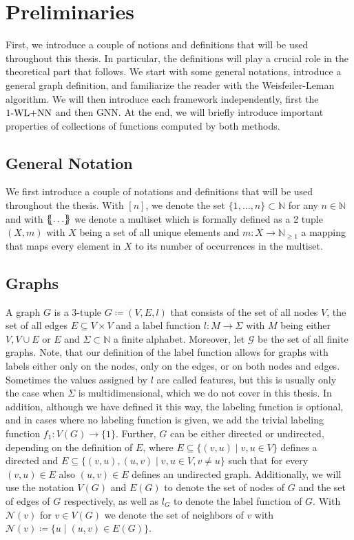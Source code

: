 \section{Preliminaries}
First, we introduce a couple of notions and definitions that will be used throughout this thesis. In particular, the definitions will play a crucial role in the theoretical part that follows. We start with some general notations, introduce a general graph definition, and familiarize the reader with the Weisfeiler-Leman algorithm. We will then introduce each framework independently, first the $\text{1-WL+NN}$ and then GNN. At the end, we will briefly introduce important properties of collections of functions computed by both methods.

\subsection{General Notation}
We first introduce a couple of notations and definitions that will be used throughout the thesis. With $[n]$, we denote the set $\{1, \ldots, n\} \subset \mathbb{N}$ for any $n \in \mathbb{N}$ and with $\{\!\!\{ \ldots \}\!\!\}$ we denote a multiset which is formally defined as a 2 tuple $(X, m)$ with $X$ being a set of all unique elements and $m: X \rightarrow \mathbb{N}_{\geq 1}$ a mapping that maps every element in $X$ to its number of occurrences in the multiset.

\subsection{Graphs}
A graph $G$ is a 3-tuple $G\coloneqq (V, E, l)$ that consists of the set of all nodes $V$, the set of all edges $E \subseteq V \times V$ and a label function $l: M \rightarrow \Sigma$ with $M$ being either $V, V \cup E$ or $E$ and $\Sigma \subset \mathbb{N}$ a finite alphabet. Moreover, let $\mathcal{G}$ be the set of all finite graphs. Note, that our definition of the label function allows for graphs with labels either only on the nodes, only on the edges, or on both nodes and edges. Sometimes the values assigned by $l$ are called features, but this is usually only the case when $\Sigma$ is multidimensional, which we do not cover in this thesis. In addition, although we have defined it this way, the labeling function is optional, and in cases where no labeling function is given, we add the trivial labeling function $f_1: V(G) \rightarrow \{1\}$. Further, $G$ can be either directed or undirected, depending on the definition of $E$, where $E \subseteq \{(v,u) \mid v,u \in V\}$ defines a directed and $E \subseteq \{(v, u), (u,v) \mid v,u \in V, v\neq u\}$ such that for every $(v,u) \in E$ also $(u,v) \in E$ defines an undirected graph. Additionally, we will use the notation $V(G)$ and $E(G)$ to denote the set of nodes of $G$ and the set of edges of $G$ respectively, as well as $l_G$ to denote the label function of $G$. With $\mathcal{N}(v)$ for $v \in V(G)$ we denote the set of neighbors of $v$ with $\mathcal{N}(v) \coloneqq \{u \mid (u, v) \in E(G)\}$.

